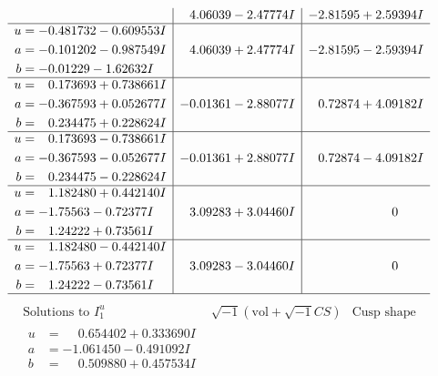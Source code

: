 \documentclass[1p]{elsarticle_modified}
\theoremstyle{definition}
\newcommand{\I}{\sqrt{-1}}
\begin{document}
$$\begin{array}{c|c|c}
 & \phantom{-}4.06039 - 2.47774 I & -2.81595 + 2.59394 I \\ \hline\begin{aligned}
u &= -0.481732 - 0.609553 I \\
a &= -0.101202 - 0.987549 I \\
b &= -0.01229 - 1.62632 I\end{aligned}
 & \phantom{-}4.06039 + 2.47774 I & -2.81595 - 2.59394 I \\ \hline\begin{aligned}
u &= \phantom{-}0.173693 + 0.738661 I \\
a &= -0.367593 + 0.052677 I \\
b &= \phantom{-}0.234475 + 0.228624 I\end{aligned}
 & -0.01361 - 2.88077 I & \phantom{-}0.72874 + 4.09182 I \\ \hline\begin{aligned}
u &= \phantom{-}0.173693 - 0.738661 I \\
a &= -0.367593 - 0.052677 I \\
b &= \phantom{-}0.234475 - 0.228624 I\end{aligned}
 & -0.01361 + 2.88077 I & \phantom{-}0.72874 - 4.09182 I \\ \hline\begin{aligned}
u &= \phantom{-}1.182480 + 0.442140 I \\
a &= -1.75563 - 0.72377 I \\
b &= \phantom{-}1.24222 + 0.73561 I\end{aligned}
 & \phantom{-}3.09283 + 3.04460 I & \phantom{-0.000000 } 0 \\ \hline\begin{aligned}
u &= \phantom{-}1.182480 - 0.442140 I \\
a &= -1.75563 + 0.72377 I \\
b &= \phantom{-}1.24222 - 0.73561 I\end{aligned}
 & \phantom{-}3.09283 - 3.04460 I & \phantom{-0.000000 } 0\\
 \hline 
 \end{array}$$\newpage$$\begin{array}{c|c|c}  
\text{Solutions to }I^u_{1}& \I (\text{vol} + \sqrt{-1}CS) & \text{Cusp shape}\\
 \hline 
\begin{aligned}
u &= \phantom{-}0.654402 + 0.333690 I \\
a &= -1.061450 - 0.491092 I \\
b &= \phantom{-}0.509880 + 0.457534 I\end{aligned}

\end{array}$$
\end{document}
